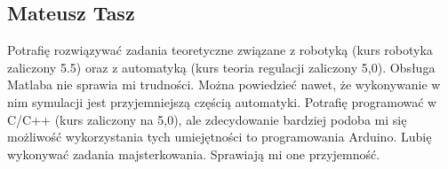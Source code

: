 \subsection{Mateusz Tasz}
Potrafię rozwiązywać zadania teoretyczne związane z robotyką (kurs robotyka zaliczony 5.5) oraz z automatyką (kurs teoria regulacji zaliczony 5,0). Obsługa Matlaba nie sprawia mi trudności. Można powiedzieć nawet, że wykonywanie w nim symulacji jest przyjemniejszą częścią automatyki. Potrafię programować w C/C++ (kurs zaliczony na 5,0), ale zdecydowanie bardziej podoba mi się możliwość wykorzystania tych umiejętności to programowania Arduino. Lubię wykonywać zadania majsterkowania. Sprawiają mi one przyjemność.
